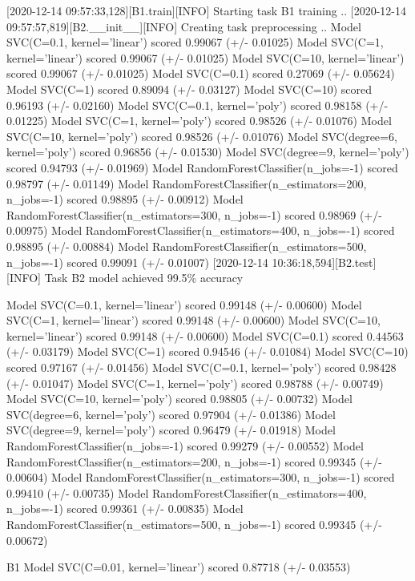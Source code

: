 \documentclass{article}
\begin{document}
[2020-12-14 09:57:33,128][B1.train][INFO] Starting task B1 training ..
[2020-12-14 09:57:57,819][B2.__init__][INFO] Creating task preprocessing ..
Model SVC(C=0.1, kernel='linear') scored 0.99067 (+/- 0.01025)
Model SVC(C=1, kernel='linear') scored 0.99067 (+/- 0.01025)
Model SVC(C=10, kernel='linear') scored 0.99067 (+/- 0.01025)
Model SVC(C=0.1) scored 0.27069 (+/- 0.05624)
Model SVC(C=1) scored 0.89094 (+/- 0.03127)
Model SVC(C=10) scored 0.96193 (+/- 0.02160)
Model SVC(C=0.1, kernel='poly') scored 0.98158 (+/- 0.01225)
Model SVC(C=1, kernel='poly') scored 0.98526 (+/- 0.01076)
Model SVC(C=10, kernel='poly') scored 0.98526 (+/- 0.01076)
Model SVC(degree=6, kernel='poly') scored 0.96856 (+/- 0.01530)
Model SVC(degree=9, kernel='poly') scored 0.94793 (+/- 0.01969)
Model RandomForestClassifier(n_jobs=-1) scored 0.98797 (+/- 0.01149)
Model RandomForestClassifier(n_estimators=200, n_jobs=-1) scored 0.98895 (+/- 0.00912)
Model RandomForestClassifier(n_estimators=300, n_jobs=-1) scored 0.98969 (+/- 0.00975)
Model RandomForestClassifier(n_estimators=400, n_jobs=-1) scored 0.98895 (+/- 0.00884)
Model RandomForestClassifier(n_estimators=500, n_jobs=-1) scored 0.99091 (+/- 0.01007)
[2020-12-14 10:36:18,594][B2.test][INFO] Task B2 model achieved 99.5\% accuracy


Model SVC(C=0.1, kernel='linear') scored 0.99148 (+/- 0.00600)
Model SVC(C=1, kernel='linear') scored 0.99148 (+/- 0.00600)
Model SVC(C=10, kernel='linear') scored 0.99148 (+/- 0.00600)
Model SVC(C=0.1) scored 0.44563 (+/- 0.03179)
Model SVC(C=1) scored 0.94546 (+/- 0.01084)
Model SVC(C=10) scored 0.97167 (+/- 0.01456)
Model SVC(C=0.1, kernel='poly') scored 0.98428 (+/- 0.01047)
Model SVC(C=1, kernel='poly') scored 0.98788 (+/- 0.00749)
Model SVC(C=10, kernel='poly') scored 0.98805 (+/- 0.00732)
Model SVC(degree=6, kernel='poly') scored 0.97904 (+/- 0.01386)
Model SVC(degree=9, kernel='poly') scored 0.96479 (+/- 0.01918)
Model RandomForestClassifier(n_jobs=-1) scored 0.99279 (+/- 0.00552)
Model RandomForestClassifier(n_estimators=200, n_jobs=-1) scored 0.99345 (+/- 0.00604)
Model RandomForestClassifier(n_estimators=300, n_jobs=-1) scored 0.99410 (+/- 0.00735)
Model RandomForestClassifier(n_estimators=400, n_jobs=-1) scored 0.99361 (+/- 0.00835)
Model RandomForestClassifier(n_estimators=500, n_jobs=-1) scored 0.99345 (+/- 0.00672)

B1
Model SVC(C=0.01, kernel='linear') scored 0.87718 (+/- 0.03553)
\end{document}
